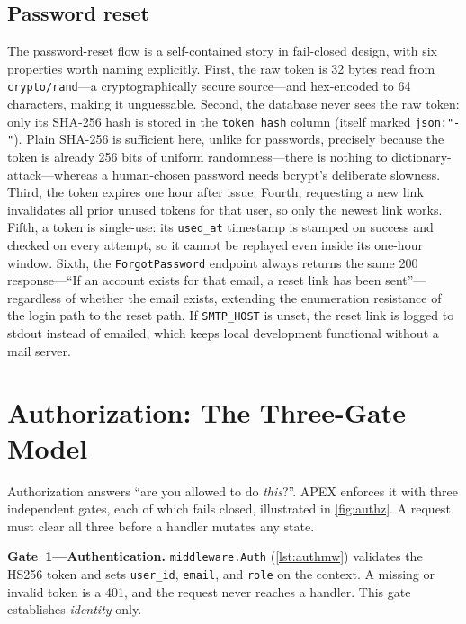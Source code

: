 \subsection{Password reset}
\label{sec:reset}

The password-reset flow is a self-contained story in fail-closed design, with
six properties worth naming explicitly. First, the raw token is 32 bytes read
from \texttt{crypto/rand}---a cryptographically secure source---and hex-encoded
to 64 characters, making it unguessable. Second, the database never sees the raw
token: only its SHA-256 hash is stored in the \texttt{token\_hash} column (itself
marked \texttt{json:"-"}). Plain SHA-256 is sufficient here, unlike for
passwords, precisely because the token is already 256 bits of uniform
randomness---there is nothing to dictionary-attack---whereas a human-chosen
password needs bcrypt's deliberate slowness. Third, the token expires one hour
after issue. Fourth, requesting a new link invalidates all prior unused tokens
for that user, so only the newest link works. Fifth, a token is single-use: its
\texttt{used\_at} timestamp is stamped on success and checked on every attempt,
so it cannot be replayed even inside its one-hour window. Sixth, the
\texttt{ForgotPassword} endpoint always returns the same 200 response---``If an
account exists for that email, a reset link has been sent''---regardless of
whether the email exists, extending the enumeration resistance of the login path
to the reset path. If \texttt{SMTP\_HOST} is unset, the reset link is logged to
stdout instead of emailed, which keeps local development functional without a
mail server.

\section{Authorization: The Three-Gate Model}
\label{sec:authz}

Authorization answers ``are you allowed to do \emph{this}?''. APEX enforces it
with three independent gates, each of which fails closed, illustrated in
\cref{fig:authz}. A request must clear all three before a handler mutates any
state.



\textbf{Gate~1---Authentication.} \texttt{middleware.Auth}
(\cref{lst:authmw}) validates the HS256 token and sets \texttt{user\_id},
\texttt{email}, and \texttt{role} on the context. A missing or invalid token is
a 401, and the request never reaches a handler. This gate establishes
\emph{identity} only.

